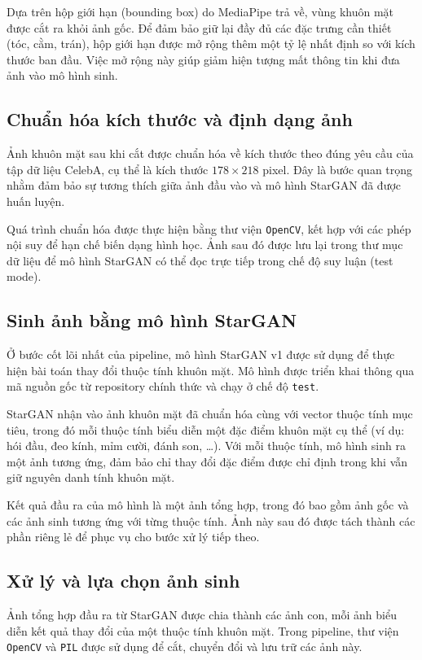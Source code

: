 \documentclass[../DoAn.tex]{subfiles}
\begin{document}
Dựa trên hộp giới hạn (bounding box) do MediaPipe trả về, vùng khuôn mặt được cắt ra khỏi ảnh gốc. Để đảm bảo giữ lại đầy đủ các đặc trưng cần thiết (tóc, cằm, trán), hộp giới hạn được mở rộng thêm một tỷ lệ nhất định so với kích thước ban đầu. Việc mở rộng này giúp giảm hiện tượng mất thông tin khi đưa ảnh vào mô hình sinh.

\subsection*{Chuẩn hóa kích thước và định dạng ảnh}

Ảnh khuôn mặt sau khi cắt được chuẩn hóa về kích thước theo đúng yêu cầu của tập dữ liệu CelebA, cụ thể là kích thước $178 \times 218$ pixel. Đây là bước quan trọng nhằm đảm bảo sự tương thích giữa ảnh đầu vào và mô hình StarGAN đã được huấn luyện.

Quá trình chuẩn hóa được thực hiện bằng thư viện \texttt{OpenCV}, kết hợp với các phép nội suy để hạn chế biến dạng hình học. Ảnh sau đó được lưu lại trong thư mục dữ liệu để mô hình StarGAN có thể đọc trực tiếp trong chế độ suy luận (test mode).

\subsection*{Sinh ảnh bằng mô hình StarGAN}

Ở bước cốt lõi nhất của pipeline, mô hình StarGAN v1 được sử dụng để thực hiện bài toán thay đổi thuộc tính khuôn mặt. Mô hình được triển khai thông qua mã nguồn gốc từ repository chính thức và chạy ở chế độ \texttt{test}. 

StarGAN nhận vào ảnh khuôn mặt đã chuẩn hóa cùng với vector thuộc tính mục tiêu, trong đó mỗi thuộc tính biểu diễn một đặc điểm khuôn mặt cụ thể (ví dụ: hói đầu, đeo kính, mỉm cười, đánh son, \ldots). Với mỗi thuộc tính, mô hình sinh ra một ảnh tương ứng, đảm bảo chỉ thay đổi đặc điểm được chỉ định trong khi vẫn giữ nguyên danh tính khuôn mặt.

Kết quả đầu ra của mô hình là một ảnh tổng hợp, trong đó bao gồm ảnh gốc và các ảnh sinh tương ứng với từng thuộc tính. Ảnh này sau đó được tách thành các phần riêng lẻ để phục vụ cho bước xử lý tiếp theo.

\subsection*{Xử lý và lựa chọn ảnh sinh}

Ảnh tổng hợp đầu ra từ StarGAN được chia thành các ảnh con, mỗi ảnh biểu diễn kết quả thay đổi của một thuộc tính khuôn mặt. Trong pipeline, thư viện \texttt{OpenCV} và \texttt{PIL} được sử dụng để cắt, chuyển đổi và lưu trữ các ảnh này.
\end{document}

